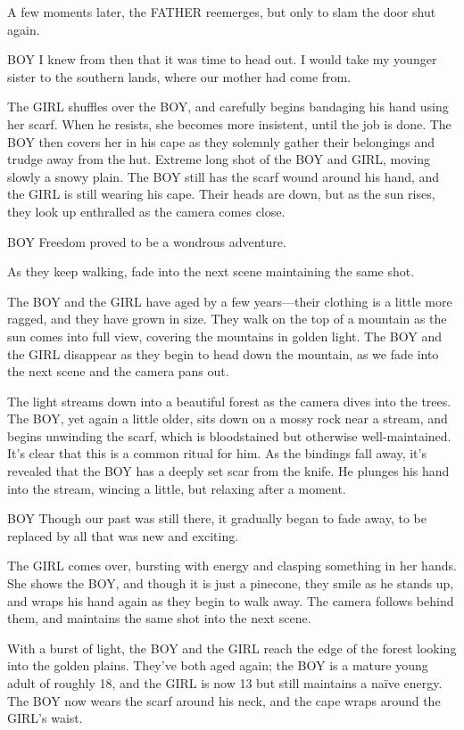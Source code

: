 \documentclass{screenplay}
\begin{document}
A few moments later, the FATHER reemerges, but only to slam the door shut again.
\begin{dialogue}{BOY}
  I knew from then that it was time to head out.
  I would take my younger sister to the southern lands, where our mother had come from.
\end{dialogue}
The GIRL shuffles over the BOY, and carefully begins bandaging his hand using her scarf.
When he resists, she becomes more insistent, until the job is done.
The BOY then covers her in his cape as they solemnly gather their belongings and trudge away from the hut.
Extreme long shot of the BOY and GIRL, moving slowly a snowy plain.
The BOY still has the scarf wound around his hand, and the GIRL is still wearing his cape.
Their heads are down, but as the sun rises, they look up enthralled as the camera comes close.
\begin{dialogue}{BOY}
  Freedom proved to be a wondrous adventure.
\end{dialogue}
As they keep walking, fade into the next scene maintaining the same shot.

The BOY and the GIRL have aged by a few years---their clothing is a little more ragged, and they have grown in size.
They walk on the top of a mountain as the sun comes into full view, covering the mountains in golden light.
The BOY and the GIRL disappear as they begin to head down the mountain, as we fade into the next scene and the camera pans out.

The light streams down into a beautiful forest as the camera dives into the trees.
The BOY, yet again a little older, sits down on a mossy rock near a stream, and begins unwinding the scarf, which is bloodstained but otherwise well-maintained.
It's clear that this is a common ritual for him.
As the bindings fall away, it's revealed that the BOY has a deeply set scar from the knife.
He plunges his hand into the stream, wincing a little, but relaxing after a moment.
\begin{dialogue}{BOY}
  Though our past was still there, it gradually began to fade away, to be replaced by all that was new and exciting.
\end{dialogue}
The GIRL comes over, bursting with energy and clasping something in her hands.
She shows the BOY, and though it is just a pinecone, they smile as he stands up, and wraps his hand again as they begin to walk away.
The camera follows behind them, and maintains the same shot into the next scene.

With a burst of light, the BOY and the GIRL reach the edge of the forest looking into the golden plains.
They've both aged again; the BOY is a mature young adult of roughly 18, and the GIRL is now 13 but still maintains a na{\"i}ve energy.
The BOY now wears the scarf around his neck, and the cape wraps around the GIRL's waist.

\end{document}
